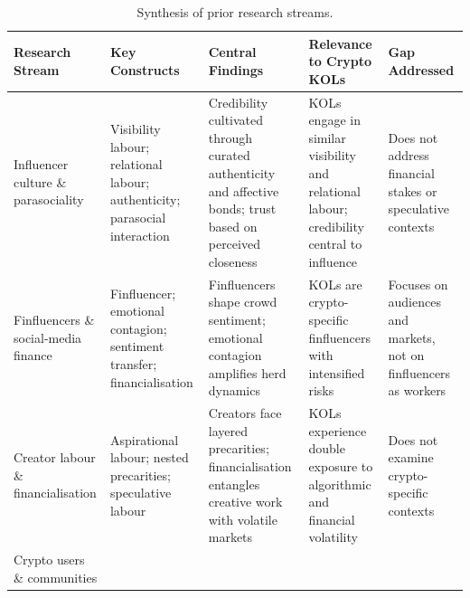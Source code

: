 \begin{table}[p]
\centering
\caption{Synthesis of prior research streams. %
}
\label{tab:lit-synthesis}
\footnotesize
\renewcommand{\arraystretch}{1.5}
\setlength{\tabcolsep}{3pt}
\begin{tabular}{@{} p{3cm} p{3cm} p{3.8cm} p{3.6cm} p{3.5cm} @{}}
\toprule
\textbf{Research Stream} & \textbf{Key Constructs} & \textbf{Central Findings} & \textbf{Relevance to Crypto KOLs} & \textbf{Gap Addressed} \\
\midrule
Influencer culture \& parasociality \newline {\cite{MarwickStatusUpdate2013,AbidinVisibility2016,Lou2019,Labrecque2014,Reinikainen2020,Khamis2017,Enke2019,BaymPlaying2018}}
  & Visibility labour; relational labour; authenticity; parasocial interaction
  & Credibility cultivated through curated authenticity and affective bonds; trust based on perceived closeness
  & KOLs engage in similar visibility and relational labour; credibility central to influence
  & Does not address financial stakes or speculative contexts \\[6pt]
Finfluencers \& social-media finance \newline {\cite{GuanFinfluencer2023,HayesFinfluence2024,HaaseFinfluencersSentiment2025,MeyerHighOnBitcoin2023,StefanouFinfluencersReg2022}}
  & Finfluencer; emotional contagion; sentiment transfer; financialisation
  & Finfluencers shape crowd sentiment; emotional contagion amplifies herd dynamics
  & KOLs are crypto-specific finfluencers with intensified risks
  & Focuses on audiences and markets, not on finfluencers as workers \\[6pt]
Creator labour \& financialisation \newline {\cite{DuffyAspirationalWork2017,DuffyNestedPrecarities2021,DuffyPlatformPractices2019,CotterVisibilityGame2019,AlacovskaSpeculativeLabour2024,AbidinInternetCelebrity2018}}
  & Aspirational labour; nested precarities; speculative labour
  & Creators face layered precarities; financialisation entangles creative work with volatile markets
  & KOLs experience double exposure to algorithmic and financial volatility
  & Does not examine crypto-specific contexts \\[6pt]
Crypto users \& communities \newline {\cite{MoserBitcoinUsability2013,Krombholz2016,Mai2020,Abramova2021,KhairuddinBitcoinMotivations2016,SasKhairuddin2017,BappyCentralizedTrust2025}}

\end{tabular}
\end{table}
